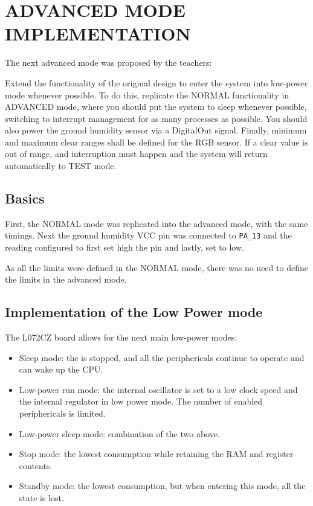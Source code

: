 \section{ADVANCED MODE IMPLEMENTATION}
\label{AdvancedChapter}
The next advanced mode was proposed by the teachers: 

Extend the functionality of the original design to enter the system into low-power mode whenever possible. 
To do this, replicate the NORMAL functionality in ADVANCED mode, where you should put the system to sleep whenever possible, switching to interrupt management for 
as many processes as possible. You should also power the ground humidity sensor via a DigitalOut signal. Finally, minimum and maximum clear ranges shall be defined 
for the RGB sensor. If a clear value is out of range, and interruption must happen and the system will return automatically to TEST mode.

\subsection{Basics}

First, the NORMAL mode was replicated into the advanced mode, with the same timings. Next the ground humidity VCC pin was connected to \texttt{PA\_13} and the reading configured to first set high the pin and lastly, set to low. 

As all the limits were defined in the NORMAL mode, there was no need to define the limits in the advanced mode.

\subsection{Implementation of the Low Power mode}

The L072CZ board allows for the next main low-power modes:
\begin{itemize}
    \item Sleep mode: the  is stopped, and all the periphericals continue to operate and can wake up the CPU.
    \item Low-power run mode: the internal oscillator is set to a low clock speed and the internal regulator in low power mode. The number of enabled periphericals is limited.
    \item Low-power sleep mode: combination of the two above.
    \item Stop mode: the lowest consumption while retaining the RAM and register contents.
    \item Standby mode: the lowest consumption, but when entering this mode, all the state is lost.
\end{itemize}


